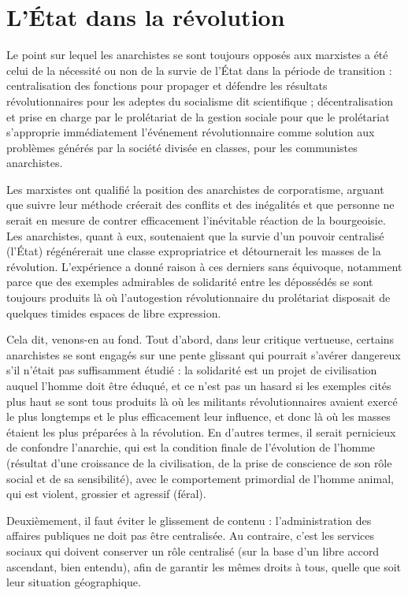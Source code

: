 \section{L'État dans la révolution}

Le point sur lequel les anarchistes se sont toujours opposés aux marxistes a été celui de la nécessité ou non de la survie de l'État dans la période de transition : centralisation des fonctions pour propager et défendre les résultats révolutionnaires pour les adeptes du socialisme dit scientifique ; décentralisation et prise en charge par le prolétariat de la gestion sociale pour que le prolétariat s'approprie immédiatement l'événement révolutionnaire comme solution aux problèmes générés par la société divisée en classes, pour les communistes anarchistes.

Les marxistes ont qualifié la position des anarchistes de corporatisme, arguant que suivre leur méthode créerait des conflits et des inégalités et que personne ne serait en mesure de contrer efficacement l'inévitable réaction de la bourgeoisie. Les anarchistes, quant à eux, soutenaient que la survie d'un pouvoir centralisé (l'État) régénérerait une classe expropriatrice et détournerait les masses de la révolution. L'expérience a donné raison à ces derniers sans équivoque, notamment parce que des exemples admirables de solidarité entre les dépossédés se sont toujours produits là où l'autogestion révolutionnaire du prolétariat disposait de quelques timides espaces de libre expression.

Cela dit, venons-en au fond. Tout d'abord, dans leur critique vertueuse, certains anarchistes se sont engagés sur une pente glissant qui pourrait s'avérer dangereux s'il n'était pas suffisamment étudié : la solidarité est un projet de civilisation auquel l'homme doit être éduqué, et ce n'est pas un hasard si les exemples cités plus haut se sont tous produits là où les militants révolutionnaires avaient exercé le plus longtemps et le plus efficacement leur influence, et donc là où les masses étaient les plus préparées à la révolution. En d'autres termes, il serait pernicieux de confondre l'anarchie, qui est la condition finale de l'évolution de l'homme (résultat d'une croissance de la civilisation, de la prise de conscience de son rôle social et de sa sensibilité), avec le comportement primordial de l'homme animal, qui est violent, grossier et agressif (féral).

Deuxièmement, il faut éviter le glissement de contenu : l'administration des affaires publiques ne doit pas être centralisée. Au contraire, c’est les services sociaux qui doivent conserver un rôle centralisé (sur la base d'un libre accord ascendant, bien entendu), afin de garantir les mêmes droits à tous, quelle que soit leur situation géographique.

